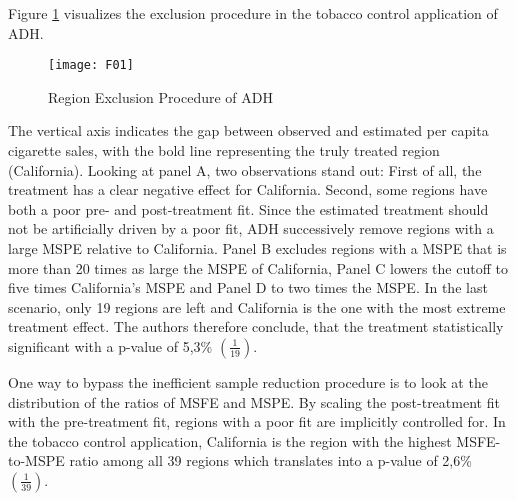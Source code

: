 Figure \ref{F_01} visualizes the exclusion procedure in the tobacco control application of \ac{ADH}. 

\begin{figure}[H]
	\centering
	\texttt{[image: F01]}
	\caption{Region Exclusion Procedure of ADH}
	\label{F_01}
\end{figure}

The vertical axis indicates the gap between observed and estimated  per capita cigarette sales, with the bold line representing the truly treated region (California). Looking at panel A, two observations stand out: First of all, the treatment has a clear negative effect for California. Second, some regions have both a poor pre- and post-treatment fit. Since the estimated treatment should not be artificially driven by a poor fit, \ac{ADH} successively remove regions with a large \ac{MSPE} relative to California. Panel B excludes regions with a \ac{MSPE} that is more than 20 times as large the \ac{MSPE} of California, Panel C lowers the cutoff to five times California's \ac{MSPE} and Panel D to  two times the \ac{MSPE}. In the last scenario, only 19 regions are left and California is the one with the most extreme treatment effect. The authors therefore conclude, that the treatment statistically significant with a p-value of 5,3\% $\left(  \frac{1}{19} \right) $. 

One way to bypass the inefficient sample reduction procedure is to look at the distribution of the ratios of \ac{MSFE} and \ac{MSPE}. By scaling the post-treatment fit with the pre-treatment fit, regions with a poor fit are implicitly controlled for. In the tobacco control application, California is the region with the highest \ac{MSFE}-to-\ac{MSPE} ratio among all 39 regions which translates into a p-value of 2,6\% $\left(  \frac{1}{39} \right) $. 

